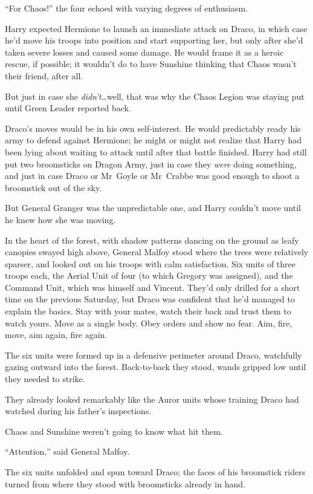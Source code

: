 “For Chaos!” the four echoed with varying degrees of enthusiasm.

Harry expected Hermione to launch an immediate attack on Draco, in which case he’d move his troops into position and start supporting her, but only after she’d taken severe losses and caused some damage. He would frame it as a heroic rescue, if possible; it wouldn’t do to have Sunshine thinking that Chaos wasn’t their friend, after all.

But just in case she \emph{didn’t}…well, that was why the Chaos Legion was staying put until Green Leader reported back.

Draco’s moves would be in his own self-interest. He would predictably ready his army to defend against Hermione; he might or might not realize that Harry had been lying about waiting to attack until after that battle finished. Harry had still put two broomsticks on Dragon Army, just in case they \emph{were} doing something, and just in case Draco or Mr~Goyle or Mr~Crabbe was good enough to shoot a broomstick out of the sky.

But General Granger was the unpredictable one, and Harry couldn’t move until he knew how she was moving.

\later

In the heart of the forest, with shadow patterns dancing on the ground as leafy canopies swayed high above, General Malfoy stood where the trees were relatively sparser, and looked out on his troops with calm satisfaction. Six units of three troops each, the Aerial Unit of four (to which Gregory was assigned), and the Command Unit, which was himself and Vincent. They’d only drilled for a short time on the previous Saturday, but Draco was confident that he’d managed to explain the basics. Stay with your mates, watch their back and trust them to watch yours. Move as a single body. Obey orders and show no fear. Aim, fire, move, aim again, fire again.

The six units were formed up in a defensive perimeter around Draco, watchfully gazing outward into the forest. Back-to-back they stood, wands gripped low until they needed to strike.

They already looked remarkably like the Auror units whose training Draco had watched during his father’s inspections.

Chaos and Sunshine weren’t going to know what hit them.

“Attention,” said General Malfoy.

The six units unfolded and spun toward Draco; the faces of his broomstick riders turned from where they stood with broomsticks already in hand.

